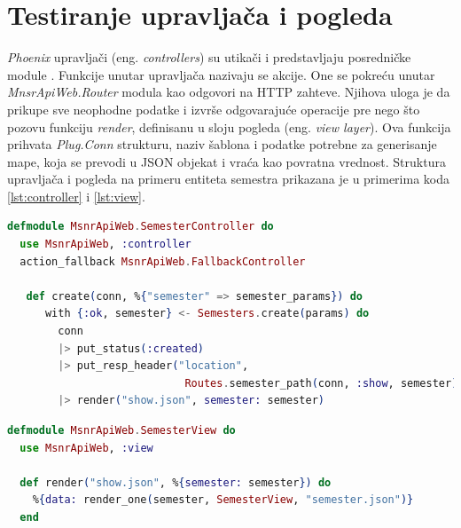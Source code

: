 \documentclass[12pt,oneside]{memoir}
\begin{document}
\section{Testiranje upravljača i pogleda}

\par \emph{Phoenix} upravljači (eng. \emph{controllers}) su utikači i predstavljaju posredničke module \cite{hexcontrol}. Funkcije unutar upravljača nazivaju se akcije. One se pokreću unutar \emph{MnsrApiWeb.Router} modula kao odgovori na HTTP zahteve. Njihova uloga je da prikupe sve neophodne podatke i izvrše odgovarajuće operacije pre nego što 
pozovu funkciju \emph{render}, definisanu u sloju pogleda (eng. \emph{view layer}). Ova funkcija prihvata \emph{Plug.Conn} strukturu, naziv šablona i podatke potrebne za generisanje mape, koja se prevodi u JSON objekat i vraća kao povratna vrednost. Struktura upravljača i pogleda na primeru entiteta semestra prikazana je u primerima koda \ref{lst:controller} i \ref{lst:view}. \\

\begin{minipage}{\linewidth}
\begin{lstlisting}[language=elixir, basicstyle=\small, caption={Struktura upravljača \emph{SemesterController}},captionpos=b, label={lst:controller}]
defmodule MsnrApiWeb.SemesterController do
  use MsnrApiWeb, :controller
  action_fallback MsnrApiWeb.FallbackController

   def create(conn, %{"semester" => semester_params}) do
      with {:ok, semester} <- Semesters.create(params) do
        conn
        |> put_status(:created)
        |> put_resp_header("location", 
        					Routes.semester_path(conn, :show, semester))
        |> render("show.json", semester: semester)
\end{lstlisting}
\end{minipage}



\begin{minipage}{\linewidth}
\begin{lstlisting}[language=elixir, basicstyle=\small, caption={Struktura pogleda \emph{SemesterView}},captionpos=b, label={lst:view}]
defmodule MsnrApiWeb.SemesterView do
  use MsnrApiWeb, :view

  def render("show.json", %{semester: semester}) do
    %{data: render_one(semester, SemesterView, "semester.json")}
  end
\end{lstlisting}
\end{minipage}
\end{document}
